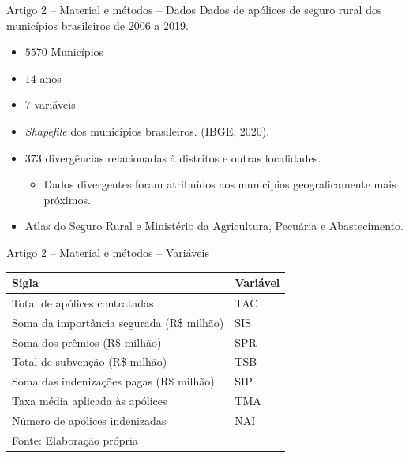 \documentclass[aspectratio=169]{beamer}
\begin{document}
\begin{frame}{Artigo 2 -- Material e métodos -- Dados}
	Dados de apólices de seguro rural dos municípios brasileiros de 2006 a 2019. 
	\vspace{0.5cm}
    \begin{itemize}
        \item $5570$ Municípios
        \item $14$ anos
        \item $7$ variáveis
        \item \textit{Shapefile} dos municípios brasileiros. (IBGE, 2020).
        \item $373$ divergências relacionadas à distritos e outras localidades.
        \begin{itemize}
            \item Dados divergentes foram atribuídos aos municípios geograficamente mais próximos. 
        \end{itemize}
        \item  Atlas do Seguro Rural e Ministério da Agricultura, Pecuária e Abastecimento.
    \end{itemize}
\end{frame}

\begin{frame}{Artigo 2 -- Material e métodos -- Variáveis}
    \begin{center}
    \small
        \begin{tabular}{ll}
            \hline 
            Sigla & Variável  \tabularnewline
            \hline 
            Total de apólices contratadas                  & TAC       \\ %
            Soma da importância segurada (R\$ milhão)      & SIS       \\ %
            Soma dos prêmios (R\$ milhão)                  & SPR       \\ %
            Total de subvenção (R\$ milhão)                & TSB       \\ %
            Soma das indenizações pagas (R\$ milhão)       & SIP       \\ %
            Taxa média aplicada às apólices                & TMA       \\ %
            Número de apólices indenizadas                 & NAI       \\ %
            \hline 
            \vspace{0.1cm}
            \footnotesize{Fonte: Elaboração própria}
            \end{tabular}
    \end{center}    
\end{frame}
\end{document}
